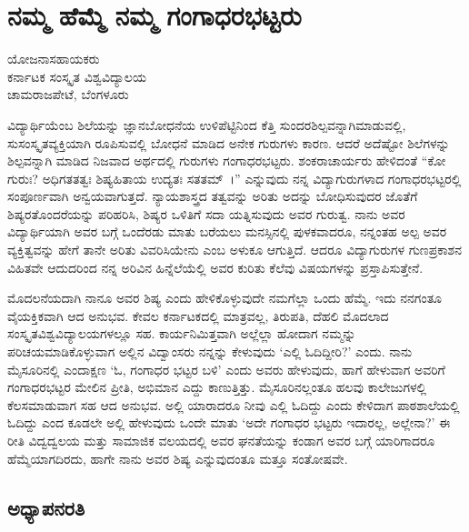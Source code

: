 {\fontsize{14}{16}\selectfont
\chapter{ನಮ್ಮ ಹೆಮ್ಮೆ ನಮ್ಮ ಗಂಗಾಧರಭಟ್ಟರು}

\begin{center}
\smallskip
ಯೋಜನಾಸಹಾಯಕರು\\
ಕರ್ನಾಟಕ ಸಂಸ್ಕೃತ ವಿಶ್ವವಿದ್ಯಾಲಯ\\
ಚಾಮರಾಜಪೇಟೆ, ಬೆಂಗಳೂರು
\addrule
\end{center}

ವಿದ್ಯಾರ್ಥಿಯೆಂಬ ಶಿಲೆಯನ್ನು ಜ್ಞಾನಬೋಧನೆಯ ಉಳಿಪೆಟ್ಟಿನಿಂದ ಕೆತ್ತಿ ಸುಂದರಶಿಲ್ಪವನ್ನಾಗಿಮಾಡುವಲ್ಲಿ, ಸುಸಂಸ್ಕೃತವ್ಯಕ್ತಿಯಾಗಿ ರೂಪಿಸುವಲ್ಲಿ ಬೋಧನೆ ಮಾಡಿದ ಅನೇಕ ಗುರುಗಳು ಕಾರಣ. ಆದರೆ ಅದೆಷ್ಟೋ ಶಿಲೆಗಳನ್ನು ಶಿಲ್ಪವನ್ನಾಗಿ ಮಾಡಿದ ನಿಜವಾದ ಅರ್ಥದಲ್ಲಿ ಗುರುಗಳು ಗಂಗಾಧರಭಟ್ಟರು. ಶಂಕರಾಚಾರ್ಯರು ಹೇಳಿದಂತೆ “ಕೋ ಗುರುಃ? ಅಧಿಗತತತ್ವಃ ಶಿಷ್ಯಹಿತಾಯ ಉದ್ಯತಃ ಸತತಮ್~।” ಎನ್ನುವುದು ನನ್ನ ವಿದ್ಯಾಗುರುಗಳಾದ ಗಂಗಾಧರಭಟ್ಟರಲ್ಲಿ ಸಂಪೂರ್ಣವಾಗಿ ಅನ್ವಯವಾಗುತ್ತದೆ. ನ್ಯಾಯಶಾಸ್ತ್ರದ ತತ್ವವನ್ನು ಅರಿತು ಅದನ್ನು ಬೋಧಿಸುವುದರ ಜೊತೆಗೆ ಶಿಷ್ಯರ\break ತೊಂದರೆ\-ಯನ್ನು ಪರಿಹರಿಸಿ, ಶಿಷ್ಯರ ಒಳಿತಿಗೆ ಸದಾ ಯತ್ನಿಸುವುದು ಅವರ ಗುರುತ್ವ. ನಾನು ಅವರ ವಿದ್ಯಾರ್ಥಿಯಾಗಿ ಅವರ ಬಗ್ಗೆ ಒಂದೆರಡು ಮಾತು ಬರೆಯಲು ಮನಸ್ಸಿನಲ್ಲಿ ಪುಳಕ\-ವಾದರೂ, ನನ್ನಂತಹ ಅಲ್ಪ ಅವರ ವ್ಯಕ್ತಿತ್ವವನ್ನು ಹೇಗೆ ತಾನೇ ಅರಿತು ವಿವರಿಸಿ\-ಯೇನು ಎಂಬ ಅಳುಕೂ ಆಗುತ್ತಿದೆ. ಆದರೂ ವಿದ್ಯಾಗುರುಗಳ ಗುಣಪ್ರಕಾಶನ ವಿಹಿತವೇ ಆದುದರಿಂದ ನನ್ನ ಅರಿವಿನ ಹಿನ್ನೆಲೆಯೆಲ್ಲಿ ಅವರ ಕುರಿತು ಕೆಲೆವು ವಿಷಯಗಳನ್ನು ಪ್ರಸ್ತಾಪಿಸುತ್ತೇನೆ.

ಮೊದಲನೆಯದಾಗಿ ನಾನೂ ಅವರ ಶಿಷ್ಯ ಎಂದು ಹೇಳಿಕೊಳ್ಳುವುದೇ ನಮಗೆಲ್ಲಾ ಒಂದು ಹೆಮ್ಮೆ. ಇದು ನನಗಂತೂ ವೈಯಕ್ತಿಕವಾಗಿ ಆದ ಅನುಭವ. ಕೇವಲ ಕರ್ನಾಟಕ\-ದಲ್ಲಿ ಮಾತ್ರವಲ್ಲ, ತಿರುಪತಿ, ದೆಹಲಿ ಮೊದಲಾದ ಸಂಸ್ಕೃತವಿಶ್ವವಿದ್ಯಾಲಯಗಳಲ್ಲೂ ಸಹ. ಕಾರ್ಯನಿಮಿತ್ತವಾಗಿ ಅಲ್ಲೆಲ್ಲಾ ಹೋದಾಗ ನಮ್ಮನ್ನು ಪರಿಚಯಮಾಡಿಕೊಳ್ಳುವಾಗ ಅಲ್ಲಿನ ವಿದ್ವಾಂಸರು ನನ್ನನ್ನು ಕೇಳುವುದು ‘ಎಲ್ಲಿ ಓದಿದ್ದೀರಿ?’ ಎಂದು. ನಾನು ಮೈಸೂರಿನಲ್ಲಿ ಎಂದಾಕ್ಷಣ ‘ಓ, ಗಂಗಾಧರ ಭಟ್ಟರ ಬಳಿ’ ಎಂದು ಅವರು ಹೇಳುವುದು, ಹಾಗೆ ಹೇಳುವಾಗ ಅವರಿಗೆ ಗಂಗಾಧರಭಟ್ಟರ ಮೇಲಿನ ಪ್ರೀತಿ, ಅಭಿಮಾನ ಎದ್ದು ಕಾಣುತ್ತಿತ್ತು. ಮೈಸೂರಿನಲ್ಲಂತೂ ಹಲವು ಕಾಲೇಜುಗಳಲ್ಲಿ ಕೆಲಸಮಾಡುವಾಗ ಸಹ ಆದ ಅನುಭವ. ಅಲ್ಲಿ ಯಾರಾದರೂ ನೀವು ಎಲ್ಲಿ ಓದಿದ್ದು ಎಂದು ಕೇಳಿದಾಗ ಪಾಠಶಾಲೆಯಲ್ಲಿ ಓದಿದ್ದು ಎಂದ ಕೂಡಲೇ ಅಲ್ಲಿ ಹೇಳುವುದು ಒಂದೇ ಮಾತು ‘ಅದೇ ಗಂಗಾಧರ ಭಟ್ಟರು ಇದಾರಲ್ಲ, ಅಲ್ಲೇನಾ?’ ಈ ರೀತಿ ವಿದ್ವದ್ವಲಯ ಮತ್ತು ಸಾಮಾಜಿಕ ವಲಯದಲ್ಲಿ ಅವರ ಘನತೆಯನ್ನು ಕಂಡಾಗ ಅವರ ಬಗ್ಗೆ ಯಾರಿಗಾದರೂ ಹೆಮ್ಮೆಯಾಗದಿರದು, ಹಾಗೇ ನಾನು ಅವರ ಶಿಷ್ಯ ಎನ್ನುವುದಂತೂ ಮತ್ತೂ ಸಂತೋಷವೇ.

\section*{ಅಧ್ಯಾಪನರತಿ}

}
